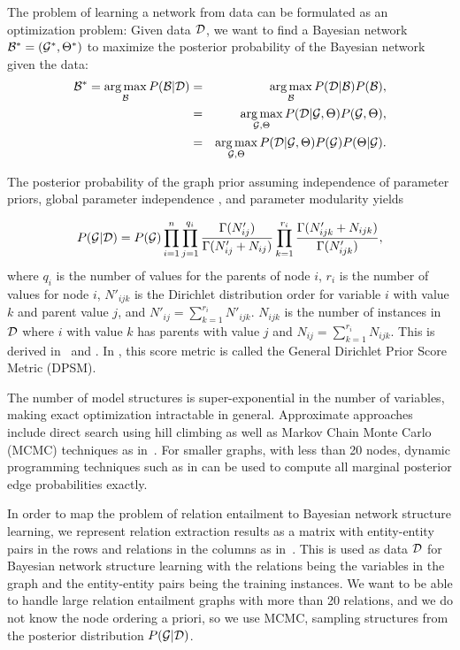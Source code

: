 \documentclass{article}
\DeclareMathOperator*{\argmax}{arg\,max}
\begin{document}
The problem of learning a network from data can be formulated as an
optimization problem: Given data ${\cal D}$, we want to find a Bayesian network ${\cal B}^{*}=({\cal G}^{*},\Theta^{*})$ to maximize
the posterior probability of the Bayesian network given the data:
\begin{eqnarray}
{\cal B}^{*}  =  \argmax_{{\cal B}}P({\cal B}|{\cal D}) & = & \argmax_{{\cal B}} P({\cal D}|{\cal B})P({\cal B}),\\
& = & \argmax_{{\cal G},\Theta} P({\cal D}|{\cal G},\Theta)P({\cal G},\Theta),\\
& = & \argmax_{{\cal G},\Theta} P({\cal D}|{\cal G},\Theta)P({\cal G})P(\Theta|{\cal G}).
\end{eqnarray}

The posterior probability of the graph prior assuming independence of parameter priors, global parameter independence \cite{Friedman:full}, and parameter modularity \cite{Heckerman1995} yields

\begin{eqnarray}
P({\cal G}|{\cal D}) = P({\cal G})\prod_{i=1}^{n}\prod_{j=1}^{q_i}
\frac{\Gamma(N'_{ij})}{\Gamma(N'_{ij} + N_{ij})}
\prod_{k=1}^{r_i}\frac{\Gamma(N'_{ijk}+N_{ijk})}{\Gamma(N'_{ijk})} ,\label{eqn:dpsm}
\end{eqnarray}
where $q_i$ is the number of values for the parents of node $i$, $r_i$ is the number of values for node $i$, $N'_{ijk}$ is the Dirichlet distribution order for variable $i$
with value $k$ and parent value $j$, and $N'_{ij} =
\sum_{k=1}^{r_i}{N'_{ijk}}$. $N_{ijk}$ is the number of instances in ${\cal D}$ where $i$ with value $k$ has parents with value $j$ and  $N_{ij} =
\sum_{k=1}^{r_i}{N_{ijk}}$. This is derived in~\cite{Cooper1} and \cite{Chang}. In \cite{Chang}, this score metric is called the General Dirichlet Prior Score Metric (DPSM).

The number of model structures is super-exponential in the number of variables, making exact optimization intractable in general. Approximate approaches include direct search using hill climbing as well as Markov Chain Monte Carlo (MCMC) techniques as in~\cite{Friedman:full}. For smaller graphs, with less than 20 nodes, dynamic programming techniques such as in \cite{DBLP:conf/uai/EatonM07} can be used to compute all marginal posterior edge probabilities exactly. 

In order to map the problem of relation entailment to Bayesian network structure learning, we represent relation extraction results as a matrix with entity-entity pairs in the rows and relations in the columns as in~\cite{riedel13relation}. This is used as data $\cal D$ for Bayesian network structure learning with the relations being the variables in the graph and the entity-entity pairs being the training instances. We want to be able to handle large relation entailment graphs with more than 20 relations, and we do not know the node ordering a priori, so we use MCMC, sampling structures from the posterior distribution $P({\cal G}|{\cal D})$.
\end{document}
